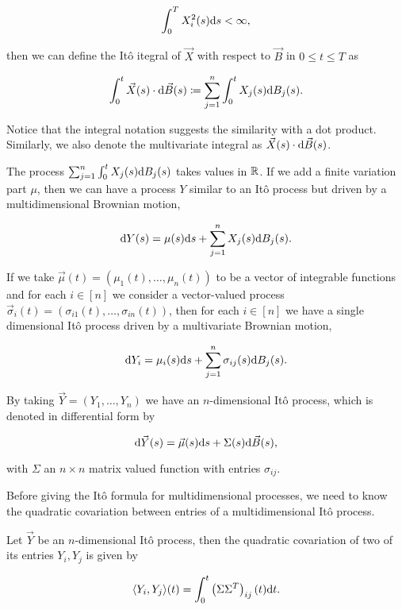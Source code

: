 \begin{equation*}
    \int_0^T X_i^2(s) \mathrm d s < \infty,
\end{equation*}

\noindent then we can define the Itô itegral of $\vec X$ with respect to $\vec B$ in $0 \le t \le T$ as

\begin{equation*}
    \int_0^t \vec X(s) \cdot \mathrm d \vec B(s) \coloneqq \sum_{j=1}^n \int_0^t X_j(s) \mathrm d B_j (s).
\end{equation*}

Notice that the integral notation suggests the similarity with a dot product. Similarly, we also denote the multivariate integral as $\vec X(s) \cdot \mathrm d \vec B(s)$.

The process $\sum_{j=1}^n \int_0^t X_j(s) \mathrm d B_j (s)$ takes values in $\mathbb R$. If we add a finite variation part $\mu$, then we can have a process $Y$ similar to an Itô process but driven by a multidimensional Brownian motion,

\begin{equation*}
    \mathrm d Y (s) = \mu(s) \mathrm d s + \sum_{j=1}^n X_j(s) \mathrm d B_j (s).
\end{equation*}

If we take $\vec \mu(t) = (\mu_1(t), \dots, \mu_n (t))$ to be a vector of integrable functions and for each $i \in [n]$ we consider a vector-valued process $\vec \sigma_i(t) = (\sigma_{i1}(t), \dots, \sigma_{in}(t))$, then for each $i \in [n]$ we have a single dimensional Itô process driven by a multivariate Brownian motion,

\begin{equation*}
    \mathrm d Y_i = \mu_i(s) \mathrm d s + \sum_{j=1}^n \sigma_{ij}(s) \mathrm d B_j (s).
\end{equation*}


By taking $\vec Y = (Y_1, \dots, Y_n)$ we have an $n$-dimensional Itô process, which is denoted in differential form by

\begin{equation*}
    \mathrm d \vec Y (s) = \vec \mu (s) \mathrm d s + \Sigma (s) \mathrm d \vec B (s),
\end{equation*}

\noindent with $\Sigma$ an $n\times n$ matrix valued function with entries $\sigma_{ij}$.

Before giving the Itô formula for multidimensional processes, we need to know the quadratic covariation between entries of a multidimensional Itô process. 

\begin{theorem}
    Let $\vec Y$ be an $n$-dimensional Itô process, then the quadratic covariation of two of its entries $Y_i, Y_j$ is given by

    \begin{equation*}
        \langle Y_i, Y_j \rangle (t) = \int_0^t \left( \Sigma \Sigma^T \right)_{ij} (t) \mathrm d t.
    \end{equation*}
\end{theorem}

